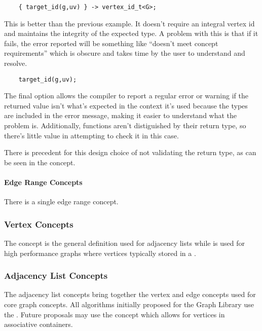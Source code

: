 \begin{lstlisting}
    { target_id(g,uv) } -> vertex_id_t<G>;
\end{lstlisting}
This is better than the previous example. It doesn’t require an integral vertex id and maintains the integrity of the expected type. 
A problem with this is that if it fails, the error reported will be something like “doesn’t meet concept requirements” which is 
obscure and takes time by the user to understand and resolve.

\begin{lstlisting}
    target_id(g,uv);
\end{lstlisting}
The final option allows the compiler to report a regular error or warning if the returned value isn't what's expected in the 
context it's used because the types are included in the error message, making it easier to understand what the problem is.
Additionally, functions aren't distiguished by their return type, so there's little value in attempting to check it in this case.

There is precedent for this design choice of not validating the return type, as can be seen in the
\href{https://en.cppreference.com/w/cpp/ranges/sized_range}{}concept.

\paragraph{Edge Range Concepts}

There is a single edge range concept.
{\small
     
}

\subsubsection{Vertex Concepts}
The  concept is the general definition used for adjacency lists while  is used for
high performance graphs where vertices typically stored in a .
{\small
     
}

\subsubsection{Adjacency List Concepts}
The adjacency list concepts bring together the vertex and edge concepts used for core graph concepts. 
All algorithms initially proposed for the Graph Library use the . Future
proposals may use the  concept which allows for vertices in associative containers.
{\small
     
}

